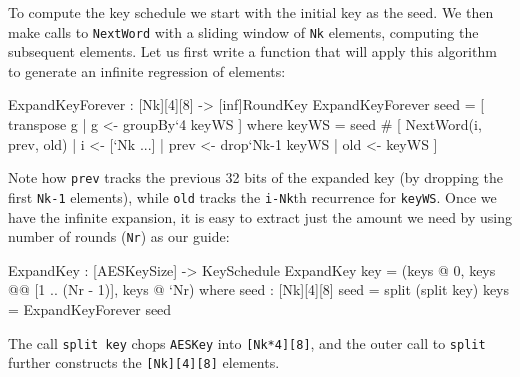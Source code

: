 To compute the key schedule we start with the initial key as the
seed. We then make calls to {\tt NextWord} with a sliding window of
{\tt Nk} elements, computing the subsequent elements. Let us first
write a function that will apply this algorithm to generate an
infinite regression of elements:\indDrop\indTranspose
\begin{code}
  ExpandKeyForever : [Nk][4][8] -> [inf]RoundKey
  ExpandKeyForever seed = [ transpose g | g <- groupBy`{4} keyWS ]
    where keyWS = seed # [ NextWord(i, prev, old)
                         | i    <- [`Nk ...]
                         | prev <- drop`{Nk-1} keyWS
                         | old  <- keyWS
                         ]
\end{code}
Note how {\tt prev} tracks the previous 32 bits of the expanded key
(by dropping the first {\tt Nk-1} elements), while {\tt old} tracks
the {\tt i-Nk}th recurrence for {\tt keyWS}. Once we have the
infinite expansion, it is easy to extract just the amount we need by
using number of rounds ({\tt Nr}) as our guide:\indIndex\indIndexs
\begin{code}
  ExpandKey : [AESKeySize] -> KeySchedule
  ExpandKey key = (keys @ 0, keys @@ [1 .. (Nr - 1)], keys @ `Nr)
    where  seed : [Nk][4][8]
           seed = split (split key)
           keys = ExpandKeyForever seed
\end{code}
The call {\tt split key} chops {\tt AESKey} into {\tt [Nk*4][8]}, and
the outer call to {\tt split} further constructs the {\tt [Nk][4][8]}
elements.

